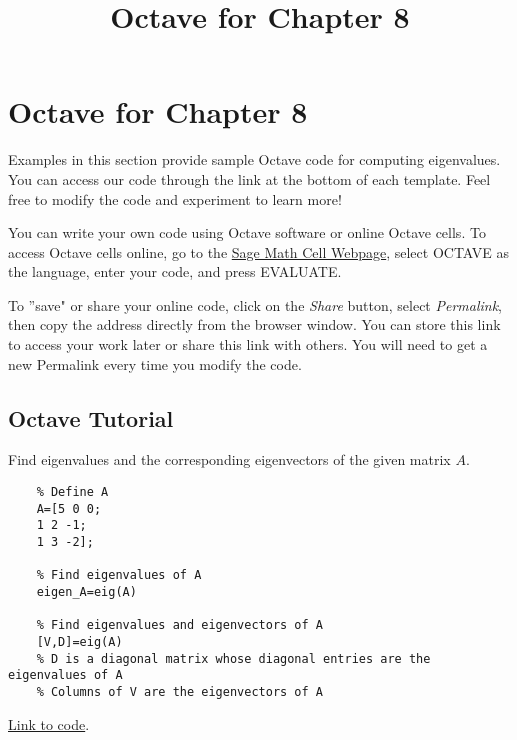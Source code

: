 \documentclass{ximera}
\title{Octave for Chapter 8} \license{CC BY-NC-SA 4.0}
\begin{document}
\begin{abstract}
\end{abstract}
\maketitle

\section*{Octave for Chapter 8}

Examples in this section provide sample Octave code for computing eigenvalues. You can access our code through the link at the bottom of each template.  Feel free to modify the code and experiment to learn more!  

You can write your own code using Octave software or online Octave cells.  To access Octave cells online, go to the \href{https://sagecell.sagemath.org/}{Sage Math Cell Webpage}, select OCTAVE as the language, enter your code, and press EVALUATE.  

To ''save" or share your online code, click on the \emph{Share} button, select \emph{Permalink}, then copy the address directly from the browser window.  You can store this link to access your work later or share this link with others.  You will need to get a new Permalink every time you modify the code.

\subsection*{Octave Tutorial}
\begin{template}\label{temp:eigen}
    Find eigenvalues and the corresponding eigenvectors of the given matrix $A$.
    
    \begin{verbatim}
    % Define A
    A=[5 0 0; 
    1 2 -1; 
    1 3 -2];
    
    % Find eigenvalues of A
    eigen_A=eig(A)
    
    % Find eigenvalues and eigenvectors of A
    [V,D]=eig(A)
    % D is a diagonal matrix whose diagonal entries are the eigenvalues of A
    % Columns of V are the eigenvectors of A 
    \end{verbatim}
    
    \href{https://sagecell.sagemath.org/?z=eJx1jsEKgkAYhO8L-w5zWShIUKOTeFiSHsGLSCz5qwvrLqxaPX5qZBF1-meG-X5GIKNaW4LkTKbFASHCBJxFiBFET7VHEJcJZ5wJnLStQLohe1VmpB6untElOct0uhu5_VNVq6fL4PyLLfJdVq6kQAY9dVFp1TirDDo1eH3HrXU9vVOyUzo_9YShpR-bBI7OjJ1dfP5V_FjwAJh4TrQ=&lang=octave&interacts=eJyLjgUAARUAuQ==}{Link to code}.
    \end{template}
\end{document}
